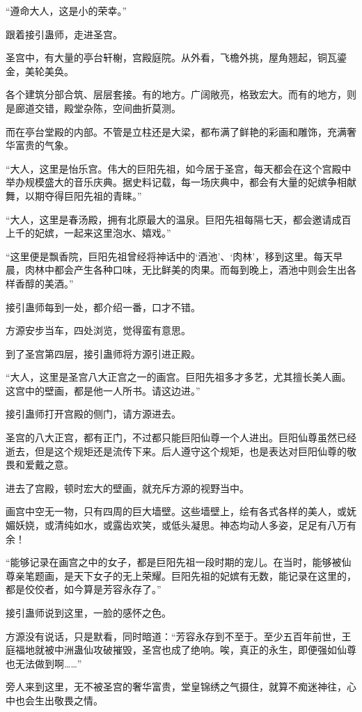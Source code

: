 \begin{this_body}
“遵命大人，这是小的荣幸。”

跟着接引蛊师，走进圣宫。

圣宫中，有大量的亭台轩榭，宫殿庭院。从外看，飞檐外挑，屋角翘起，铜瓦鎏金，美轮美奂。

各个建筑分部合筑、层层套接。有的地方。广阔敞亮，格致宏大。而有的地方，则是廊道交错，殿堂杂陈，空间曲折莫测。

而在亭台堂殿的内部。不管是立柱还是大梁，都布满了鲜艳的彩画和雕饰，充满奢华富贵的气象。

“大人，这里是怡乐宫。伟大的巨阳先祖，如今居于圣宫，每天都会在这个宫殿中举办规模盛大的音乐庆典。据史料记载，每一场庆典中，都会有大量的妃嫔争相献舞，以期夺得巨阳先祖的青睐。”

“大人，这里是春汤殿，拥有北原最大的温泉。巨阳先祖每隔七天，都会邀请成百上千的妃嫔，一起来这里泡水、嬉戏。”

“这里便是飘香院，巨阳先祖曾经将神话中的‘酒池’、‘肉林’，移到这里。每天早晨，肉林中都会产生各种口味，无比鲜美的肉果。而每到晚上，酒池中则会生出各样香醇的美酒。”

接引蛊师每到一处，都介绍一番，口才不错。

方源安步当车，四处浏览，觉得蛮有意思。

到了圣宫第四层，接引蛊师将方源引进正殿。

“大人，这里是圣宫八大正宫之一的画宫。巨阳先祖多才多艺，尤其擅长美人画。这宫中的壁画，都是他一人所书。请这边进。”

接引蛊师打开宫殿的侧门，请方源进去。

圣宫的八大正宫，都有正门，不过都只能巨阳仙尊一个人进出。巨阳仙尊虽然已经逝去，但是这个规矩还是流传下来。后人遵守这个规矩，也是表达对巨阳仙尊的敬畏和爱戴之意。

进去了宫殿，顿时宏大的壁画，就充斥方源的视野当中。

画宫中空无一物，只有四周的巨大墙壁。这些墙壁上，绘有各式各样的美人，或妩媚妖娆，或清纯如水，或露齿欢笑，或低头凝思。神态均动人多姿，足足有八万有余！

“能够记录在画宫之中的女子，都是巨阳先祖一段时期的宠儿。在当时，能够被仙尊亲笔题画，是天下女子的无上荣耀。巨阳先祖的妃嫔有无数，能记录在这里的，都是佼佼者，如今算是芳容永存了。”

接引蛊师说到这里，一脸的感怀之色。

方源没有说话，只是默看，同时暗道：“芳容永存到不至于。至少五百年前世，王庭福地就被中洲蛊仙攻破摧毁，圣宫也成了绝响。唉，真正的永生，即便强如仙尊也无法做到啊……”

旁人来到这里，无不被圣宫的奢华富贵，堂皇锦绣之气摄住，就算不痴迷神往，心中也会生出敬畏之情。


\end{this_body}
